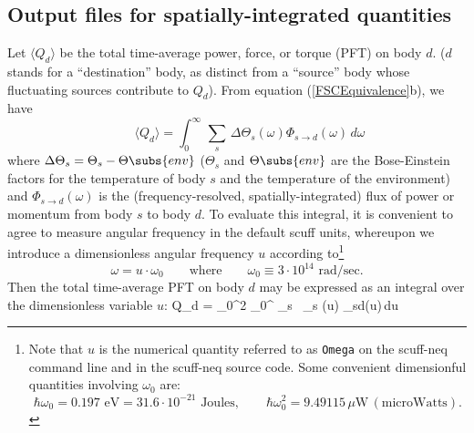 \documentclass[letterpaper]{article}
\newcommand{\wh}{\widehat}
\begin{document}
\newpage
\subsection{Output files for spatially-integrated quantities}

Let $\big\langle Q_d\big\rangle$ be the total time-average 
power, force, or torque (PFT) on body $d$. ($d$ stands for a 
``destination'' body, as distinct from a ``source'' body
whose fluctuating sources contribute to $Q_d$). From 
equation (\ref{FSCEquivalence}b), we have
\begin{equation}
 \qquad \big\langle Q_d\big\rangle
 = \int_0^\infty \, \sum_s \, \Delta \Theta_s(\omega) 
   \Phi_{s\to d}(\omega)\,d\omega
\end{equation}
where $\Delta\Theta_s=\Theta_s-\Theta\subs{env}$ ($\Theta_s$ and
$\Theta\subs{env}$ are the Bose-Einstein factors for the 
temperature of body $s$ and the temperature of the environment)
and $\Phi_{s \to d}(\omega)$ is the 
(frequency-resolved, spatially-integrated) flux of power or momentum
from body $s$ to body $d$.
To evaluate this integral, it is convenient to agree to measure angular
frequency in the default {\sc scuff} units, whereupon we 
introduce a dimensionless angular frequency $u$ according 
to\footnote{Note that $u$ is the numerical quantity referred to as 
\texttt{Omega} on the {\sc scuff-neq} command line and in the 
{\sc scuff-neq} source code. Some convenient
dimensionful quantities involving $\omega_0$ are:
$$
 \hbar\omega_0=0.197\text{ eV}=31.6\cdot10^{-21} \text{ Joules}, 
 \qquad 
 \hbar\omega_0^2=9.49115\,\mu\text{W} \, (\text{microWatts}).
$$}
$$ \omega=u\cdot \omega_0
   \qquad \text{where} \qquad
   \omega_0\equiv 3\cdot 10^{14}\text{ rad/sec}.
$$
Then the total time-average PFT on body $d$ may be
expressed as an integral over the dimensionless variable $u$:
{
 \qquad \big\langle Q_d\big\rangle
 = \hbar \omega_0^2
   \int_0^\infty 
              \sum_s \, \Delta \wh \Theta_s (u) \Phi{}_{s\to d}(u)\,du
}
\end{document}
